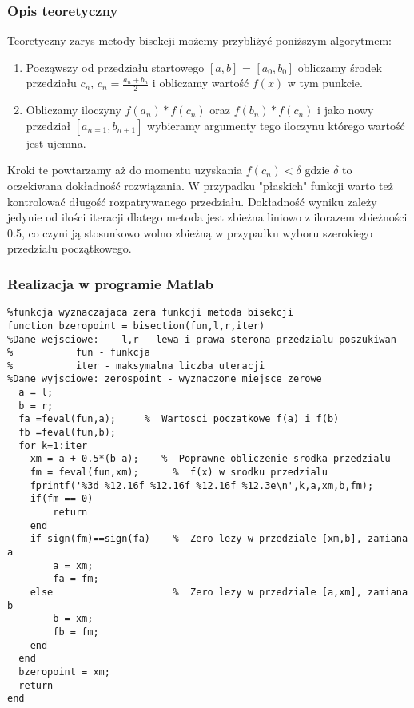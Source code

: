 \documentclass[11pt, oneside]{article}   	%
\begin{document}
\subsubsection{Opis teoretyczny}
Teoretyczny zarys metody bisekcji możemy przybliżyć poniższym algorytmem:
\begin{enumerate}
  \item Począwszy od przedziału startowego $[a,b]$ = $[a_{0},b_{0}]$ obliczamy środek przedziału $c_{n}$,
  	$c_{n} = \frac{a_{n}+b_{n}}{2}$
  i obliczamy wartość $f(x)$ w tym punkcie. 
  \item Obliczamy iloczyny $f(a_{n})*f(c_{n})$ oraz $f(b_{n})*f(c_{n})$ i jako nowy przedział $[a_{n=1},b_{n+1}]$
  wybieramy argumenty tego iloczynu którego wartość jest ujemna. 
\end{enumerate} 
Kroki te powtarzamy aż do momentu uzyskania $f(c_{n})<\delta$ gdzie $\delta$ to oczekiwana dokładność rozwiązania. W przypadku "płaskich"  funkcji warto też kontrolować długość rozpatrywanego przedziału. 
Dokładność wyniku zależy jedynie od ilości iteracji dlatego metoda jest zbieżna liniowo z ilorazem zbieżności 0.5, co czyni ją stosunkowo wolno zbieżną w przypadku wyboru szerokiego przedziału początkowego. 


\subsubsection{Realizacja w programie Matlab}
\begin{lstlisting}
%funkcja wyznaczajaca zera funkcji metoda bisekcji
function bzeropoint = bisection(fun,l,r,iter)
%Dane wejsciowe:	l,r - lewa i prawa sterona przedzialu poszukiwan
%			fun - funkcja 
%			iter - maksymalna liczba uteracji
%Dane wyjsciowe: zerospoint - wyznaczone miejsce zerowe
  a = l; 
  b = r;
  fa =feval(fun,a);     %  Wartosci poczatkowe f(a) i f(b)
  fb =feval(fun,b);
  for k=1:iter
    xm = a + 0.5*(b-a);    %  Poprawne obliczenie srodka przedzialu
    fm = feval(fun,xm);      %  f(x) w srodku przedzialu
    fprintf('%3d %12.16f %12.16f %12.16f %12.3e\n',k,a,xm,b,fm);
    if(fm == 0)
        return
    end
    if sign(fm)==sign(fa)    %  Zero lezy w przedziale [xm,b], zamiana a
        a = xm;
        fa = fm;
    else                     %  Zero lezy w przedziale [a,xm], zamiana b
        b = xm;
        fb = fm;
    end
  end
  bzeropoint = xm; 
  return
end
\end{lstlisting}
\end{document}
